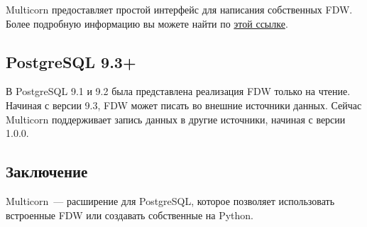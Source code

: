 Multicorn предоставляет простой интерфейс для написания собственных FDW. Более подробную информацию вы можете найти по \href{http://multicorn.org/implementing-an-fdw/}{этой ссылке}.


\subsection{PostgreSQL 9.3+}

В PostgreSQL 9.1 и 9.2 была представлена реализация FDW только на чтение. Начиная с версии 9.3, FDW может писать во внешние источники данных. Сейчас Multicorn поддерживает запись данных в другие источники, начиная с версии 1.0.0.

\subsection{Заключение}

Multicorn~--- расширение для PostgreSQL, которое позволяет использовать встроенные FDW или создавать собственные на Python.
